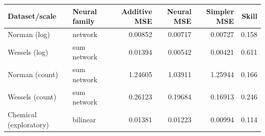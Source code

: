 \begin{tabular}{llrrrr}
\toprule
Dataset/scale & Neural family & Additive MSE & Neural MSE & Simpler MSE & Skill \\
\midrule
Norman (log) & network & 0.00852 & 0.00717 & 0.00727 & 0.158 \\
Wessels (log) & sum network & 0.01394 & 0.00542 & 0.00421 & 0.611 \\
Norman (count) & sum network & 1.24605 & 1.03911 & 1.25944 & 0.166 \\
Wessels (count) & sum network & 0.26123 & 0.19684 & 0.16913 & 0.246 \\
Chemical (exploratory) & bilinear & 0.01381 & 0.01223 & 0.00994 & 0.114 \\
\bottomrule
\end{tabular}
